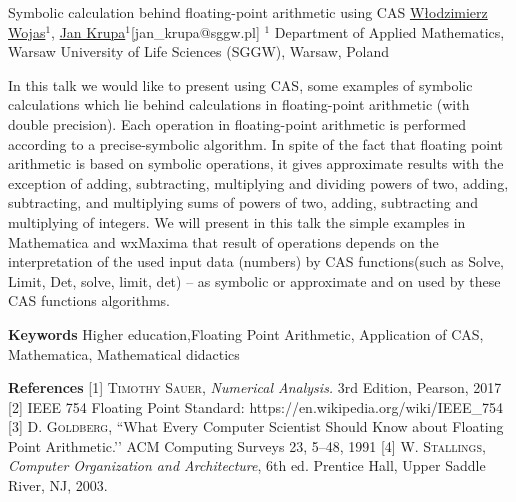 


\begin{abstract_online}{Symbolic calculation behind floating-point arithmetic using CAS}{%
        \underline{W{\l}odzimierz Wojas}$^{1}$, \underline{Jan Krupa}$^{1}$}{[jan\_krupa@sggw.pl]
        }{%
        $^1$ Department of Applied Mathematics, Warsaw University of Life Sciences (SGGW), Warsaw, Poland}




In this talk we would like to present using CAS, some examples of symbolic calculations which lie behind calculations in floating-point arithmetic (with double precision). Each operation in floating-point arithmetic is performed according to a precise-symbolic algorithm. In spite of the fact that floating point arithmetic is based on symbolic operations, it gives approximate results with the exception of adding, subtracting, multiplying and dividing powers of two, adding, subtracting, and multiplying sums of powers of two, adding, subtracting and multiplying of integers.
We will present in this talk the simple examples in Mathematica and wxMaxima that result of operations depends on the interpretation of the used input data (numbers) by CAS functions(such as Solve, Limit, Det, solve, limit, det) – as symbolic or approximate and on used by these CAS functions algorithms.


\textbf{Keywords} \newline{} Higher education,Floating Point Arithmetic, Application of CAS, Mathematica, Mathematical didactics




\textbf{References}\newline{}
[1] \textsc{Timothy Sauer},  \emph{Numerical Analysis.} 3rd Edition, Pearson,  2017 \newline{}
[2] IEEE 754 Floating Point Standard: https://en.wikipedia.org/wiki/IEEE\_754 \newline{}
[3] \textsc{D. Goldberg},  “What Every Computer Scientist Should Know about Floating Point
Arithmetic.’’ ACM Computing Surveys 23, 5–48, 1991 \newline{}
[4] \textsc{W. Stallings}, \emph{Computer Organization and Architecture}, 6th ed. Prentice Hall, Upper Saddle River, NJ, 2003.
\end{abstract_online}